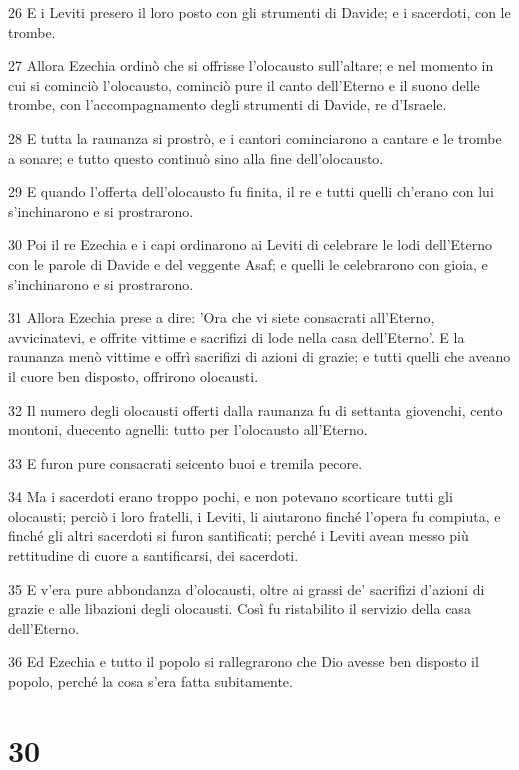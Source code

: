\par 26 E i Leviti presero il loro posto con gli strumenti di Davide; e i sacerdoti, con le trombe.
\par 27 Allora Ezechia ordinò che si offrisse l'olocausto sull'altare; e nel momento in cui si cominciò l'olocausto, cominciò pure il canto dell'Eterno e il suono delle trombe, con l'accompagnamento degli strumenti di Davide, re d'Israele.
\par 28 E tutta la raunanza si prostrò, e i cantori cominciarono a cantare e le trombe a sonare; e tutto questo continuò sino alla fine dell'olocausto.
\par 29 E quando l'offerta dell'olocausto fu finita, il re e tutti quelli ch'erano con lui s'inchinarono e si prostrarono.
\par 30 Poi il re Ezechia e i capi ordinarono ai Leviti di celebrare le lodi dell'Eterno con le parole di Davide e del veggente Asaf; e quelli le celebrarono con gioia, e s'inchinarono e si prostrarono.
\par 31 Allora Ezechia prese a dire: 'Ora che vi siete consacrati all'Eterno, avvicinatevi, e offrite vittime e sacrifizi di lode nella casa dell'Eterno'. E la raunanza menò vittime e offrì sacrifizi di azioni di grazie; e tutti quelli che aveano il cuore ben disposto, offrirono olocausti.
\par 32 Il numero degli olocausti offerti dalla raunanza fu di settanta giovenchi, cento montoni, duecento agnelli: tutto per l'olocausto all'Eterno.
\par 33 E furon pure consacrati seicento buoi e tremila pecore.
\par 34 Ma i sacerdoti erano troppo pochi, e non potevano scorticare tutti gli olocausti; perciò i loro fratelli, i Leviti, li aiutarono finché l'opera fu compiuta, e finché gli altri sacerdoti si furon santificati; perché i Leviti avean messo più rettitudine di cuore a santificarsi, dei sacerdoti.
\par 35 E v'era pure abbondanza d'olocausti, oltre ai grassi de' sacrifizi d'azioni di grazie e alle libazioni degli olocausti. Così fu ristabilito il servizio della casa dell'Eterno.
\par 36 Ed Ezechia e tutto il popolo si rallegrarono che Dio avesse ben disposto il popolo, perché la cosa s'era fatta subitamente.

\chapter{30}


